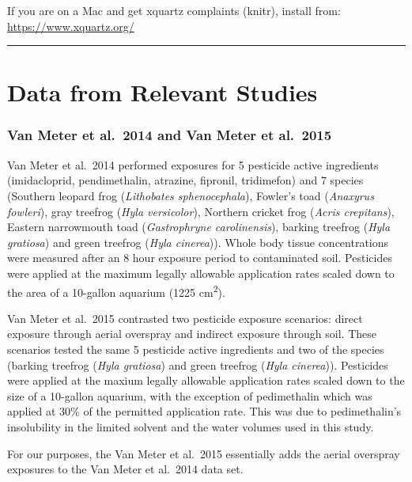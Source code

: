 \documentclass[
]{article}
\begin{document}
If you are on a Mac and get xquartz complaints (knitr), install from:
\url{https://www.xquartz.org/}

\begin{center}\rule{0.5\linewidth}{0.5pt}\end{center}

\hypertarget{data-from-relevant-studies}{%
\section{\texorpdfstring{\textbf{Data from Relevant
Studies}}{Data from Relevant Studies}}\label{data-from-relevant-studies}}

\hypertarget{van-meter-et-al.-2014-and-van-meter-et-al.-2015}{%
\subsubsection{Van Meter et al.~2014 and Van Meter et
al.~2015}\label{van-meter-et-al.-2014-and-van-meter-et-al.-2015}}

Van Meter et al.~2014 performed exposures for 5 pesticide active
ingredients (imidacloprid, pendimethalin, atrazine, fipronil,
tridimefon) and 7 species (Southern leopard frog (\emph{Lithobates
sphenocephala}), Fowler's toad (\emph{Anaxyrus fowleri}), gray treefrog
(\emph{Hyla versicolor}), Northern cricket frog (\emph{Acris
crepitans}), Eastern narrowmouth toad (\emph{Gastrophryne
carolinensis}), barking treefrog (\emph{Hyla gratiosa}) and green
treefrog (\emph{Hyla cinerea})). Whole body tissue concentrations were
measured after an 8 hour exposure period to contaminated soil.
Pesticides were applied at the maximum legally allowable application
rates scaled down to the area of a 10-gallon aquarium (1225
cm\textsuperscript{2}).

Van Meter et al.~2015 contrasted two pesticide exposure scenarios:
direct exposure through aerial overspray and indirect exposure through
soil. These scenarios tested the same 5 pesticide active ingredients and
two of the species (barking treefrog (\emph{Hyla gratiosa}) and green
treefrog (\emph{Hyla cinerea})). Pesticides were applied at the maxium
legally allowable application rates scaled down to the size of a
10-gallon aquarium, with the exception of pedimethalin which was applied
at 30\% of the permitted application rate. This was due to
pedimethalin's insolubility in the limited solvent and the water volumes
used in this study.

For our purposes, the Van Meter et al.~2015 essentially adds the aerial
overspray exposures to the Van Meter et al.~2014 data set.
\end{document}
